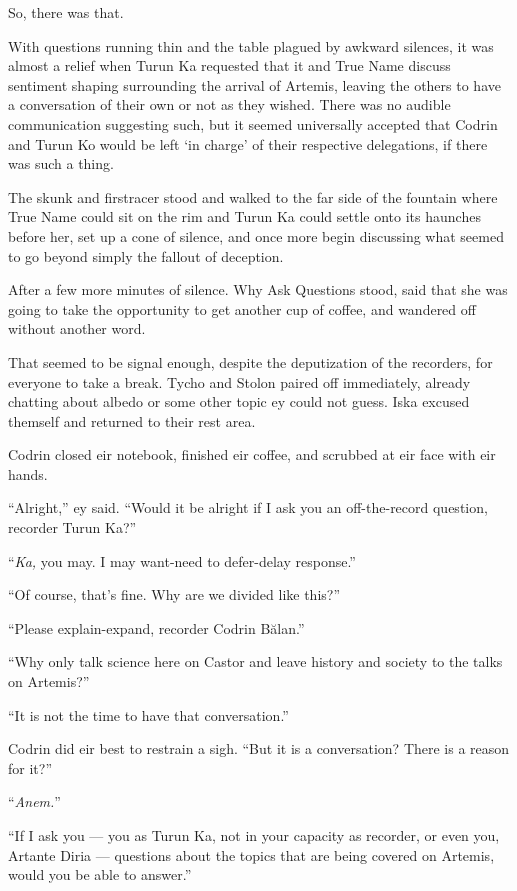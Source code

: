 So, there was that.

With questions running thin and the table plagued by awkward silences, it was almost a relief when Turun Ka requested that it and True Name discuss sentiment shaping surrounding the arrival of Artemis, leaving the others to have a conversation of their own or not as they wished. There was no audible communication suggesting such, but it seemed universally accepted that Codrin and Turun Ko would be left `in charge' of their respective delegations, if there was such a thing.

The skunk and firstracer stood and walked to the far side of the fountain where True Name could sit on the rim and Turun Ka could settle onto its haunches before her, set up a cone of silence, and once more begin discussing what seemed to go beyond simply the fallout of deception.

After a few more minutes of silence. Why Ask Questions stood, said that she was going to take the opportunity to get another cup of coffee, and wandered off without another word.

That seemed to be signal enough, despite the deputization of the recorders, for everyone to take a break. Tycho and Stolon paired off immediately, already chatting about albedo or some other topic ey could not guess. Iska excused themself and returned to their rest area.

Codrin closed eir notebook, finished eir coffee, and scrubbed at eir face with eir hands.

``Alright,'' ey said. ``Would it be alright if I ask you an off-the-record question, recorder Turun Ka?''

``\emph{Ka,} you may. I may want-need to defer-delay response.''

``Of course, that's fine. Why are we divided like this?''

``Please explain-expand, recorder Codrin Bălan.''

``Why only talk science here on Castor and leave history and society to the talks on Artemis?''

``It is not the time to have that conversation.''

Codrin did eir best to restrain a sigh. ``But it is a conversation? There is a reason for it?''

``\emph{Anem.}''

``If I ask you — you as Turun Ka, not in your capacity as recorder, or even you, Artante Diria — questions about the topics that are being covered on Artemis, would you be able to answer.''

